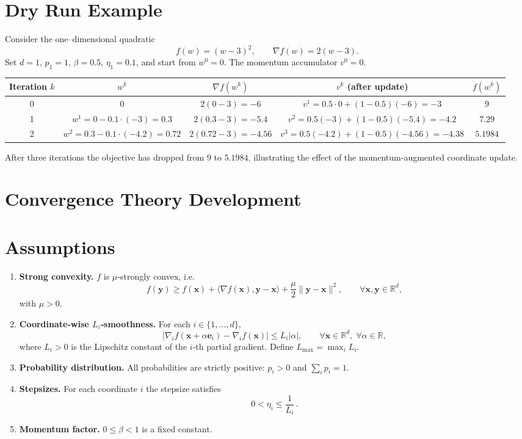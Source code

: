 \documentclass[11pt]{article}
\begin{document}
\section{Dry Run Example}
Consider the one–dimensional quadratic
\[
f(w) = (w-3)^2,\qquad \nabla f(w)=2(w-3).
\]
Set $d=1$, $p_1=1$, $\beta=0.5$, $\eta_1=0.1$, and start from $w^{0}=0$.
The momentum accumulator $v^{0}=0$.

\begin{center}
\begin{tabular}{c|c|c|c|c}
Iteration $k$ & $w^{k}$ & $\nabla f(w^{k})$ & $v^{k}$ (after update) & $f(w^{k})$\\\hline
0 & $0$ & $2(0-3)=-6$ & $v^{1}=0.5\cdot0+(1-0.5)(-6)=-3$ & $9$\\
1 & $w^{1}=0-0.1\cdot(-3)=0.3$ & $2(0.3-3)=-5.4$ & $v^{2}=0.5(-3)+(1-0.5)(-5.4)=-4.2$ & $7.29$\\
2 & $w^{2}=0.3-0.1\cdot(-4.2)=0.72$ & $2(0.72-3)=-4.56$ & $v^{3}=0.5(-4.2)+(1-0.5)(-4.56)=-4.38$ & $5.1984$\\
\end{tabular}
\end{center}
After three iterations the objective has dropped from $9$ to $5.1984$,
illustrating the effect of the momentum‑augmented coordinate update.

\section*{Convergence Theory Development}

\section{Assumptions}
\begin{enumerate}[label={\bf A\arabic*:}, leftmargin=*, itemsep=2pt]
\item \textbf{Strong convexity.}
$f$ is $\mu$‑strongly convex, i.e.
\[
f(\mathbf y) \ge f(\mathbf x)+\langle\nabla f(\mathbf x),\mathbf y-\mathbf x\rangle
+\frac{\mu}{2}\|\mathbf y-\mathbf x\|^{2},
\qquad\forall\mathbf x,\mathbf y\in\mathbb R^{d},
\]
with $\mu>0$.
\item \textbf{Coordinate‑wise $L_i$‑smoothness.}
For each $i\in\{1,\dots ,d\}$,
\[
\bigl|\nabla_i f(\mathbf x+\alpha\mathbf e_i)-\nabla_i f(\mathbf x)\bigr|
\le L_i|\alpha|,\qquad\forall\mathbf x\in\mathbb R^{d},\;\forall\alpha\in\mathbb R,
\]
where $L_i>0$ is the Lipschitz constant of the $i$‑th partial gradient.
Define $L_{\max}= \max_i L_i$.
\item \textbf{Probability distribution.}
All probabilities are strictly positive: $p_i>0$ and $\sum_i p_i=1$.
\item \textbf{Stepsizes.}
For each coordinate $i$ the stepsize satisfies
\[
0<\eta_i\le\frac{1}{L_i}\,.
\]
\item \textbf{Momentum factor.}
$0\le \beta<1$ is a fixed constant.
\end{enumerate}
\end{document}
